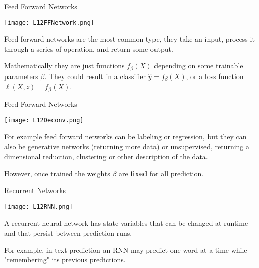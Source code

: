 \documentclass[10pt, table, dvipsnames,xcdraw, handout]{beamer}
\begin{document}
\begin{frame}[fragile]{Feed Forward Networks}
  \begin{minipage}[t][0.5\textheight][t]{\textwidth}
	\centering \texttt{[image: L12FFNetwork.png]} 
  \end{minipage}
  \vfill
\begin{minipage}[t][0.5\textheight][t]{\textwidth}
Feed forward networks are the most common type, they take an input, process it through a series of operation, and return some output. \newline\pause 

Mathematically they are just functions $f_\beta (X)$ depending on some trainable parameters $\beta$. They could result in a classifier $\hat{y} = f_\beta (X)$, or a loss function $\ell(X,z) = f_\beta (X)$. 
\end{minipage}
\end{frame}





\begin{frame}[fragile]{Feed Forward Networks}
  \begin{minipage}[t][0.5\textheight][t]{\textwidth}
	\centering \texttt{[image: L12Deconv.png]} 
  \end{minipage}
  \vfill
\begin{minipage}[t][0.5\textheight][t]{\textwidth}
For example feed forward networks can be labeling or regression, but they can also be generative networks (returning more data) or unsupervised, returning a dimensional reduction, clustering or other description of the data. \newline \pause

However, once trained the weights $\beta$ are \textbf{fixed} for all prediction.
\end{minipage}
\end{frame}



\begin{frame}[fragile]{Recurrent Networks}
  \begin{minipage}[t][0.5\textheight][t]{\textwidth}
	\centering \texttt{[image: L12RNN.png]} 
  \end{minipage}
  \vfill
\begin{minipage}[t][0.5\textheight][t]{\textwidth}
A recurrent neural network has state variables that can be changed at runtime and that persist between prediction runs.\pause\newline

For example, in text prediction an RNN may predict one word at a time while "remembering" its previous predictions. 
\end{minipage}
\end{frame}
\end{document}

